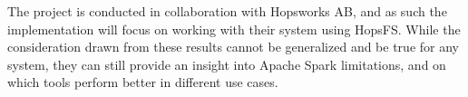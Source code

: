 The project is conducted in collaboration with Hopsworks AB, and as such the implementation will focus on working with their system using \gls{HopsFS}. While the consideration drawn from these results cannot be generalized and be true for any system, they can still provide an insight into Apache Spark limitations, and on which tools perform better in different use cases. 